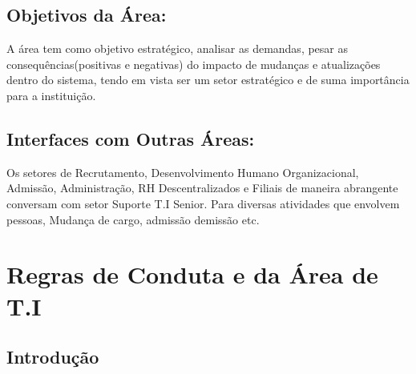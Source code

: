 \documentclass[letterpaper,10pt,brazil]{sphinxmanual}
\begin{document}
\subsection{Objetivos da Área:}
\label{\detokenize{visao_geral:objetivos-da-area}}
\sphinxAtStartPar
A área tem como objetivo estratégico, analisar as demandas, pesar as
consequências(positivas e negativas) do impacto de mudanças e
atualizações dentro do sistema, tendo em vista ser um setor estratégico
e de suma importância para a instituição.


\subsection{Interfaces com Outras Áreas:}
\label{\detokenize{visao_geral:interfaces-com-outras-areas}}
\sphinxAtStartPar
Os setores de Recrutamento, Desenvolvimento Humano Organizacional,
Admissão, Administração, RH Descentralizados e Filiais de maneira
abrangente conversam com setor Suporte T.I Senior. Para diversas
atividades que envolvem pessoas, Mudança de cargo, admissão
demissão etc.

\noindent{}

\sphinxstepscope


\section{Regras de Conduta e da Área de T.I}
\label{\detokenize{regras:regras-de-conduta-e-da-area-de-t-i}}\label{\detokenize{regras::doc}}

\subsection{Introdução}
\label{\detokenize{regras:introducao}}
\end{document}
